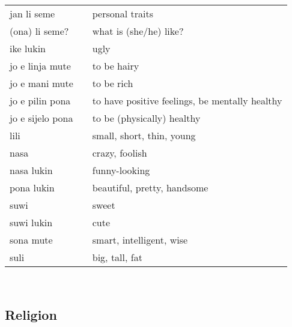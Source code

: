 \begin{supertabular}{p{4,5cm}|ll}
    jan li seme\     &  & personal traits                                \\
    (ona) li seme?   &  & what is (she/he) like?                         \\
    ike lukin        &  & ugly                                           \\
    jo e linja mute  &  & to be hairy                                    \\
    jo e mani mute   &  & to be rich                                     \\
    jo e pilin pona  &  & to have positive feelings, be mentally healthy \\
    jo e sijelo pona &  & to be (physically) healthy                     \\
    lili             &  & small, short, thin, young                      \\
    nasa             &  & crazy, foolish                                 \\
    nasa lukin       &  & funny-looking                                  \\
    pona lukin       &  & beautiful, pretty, handsome                    \\
    suwi             &  & sweet                                          \\
    suwi lukin       &  & cute                                           \\
    sona mute        &  & smart, intelligent, wise                       \\
    suli             &  & big, tall, fat                                 \\
\end{supertabular} \\

\subsection{Religion}

